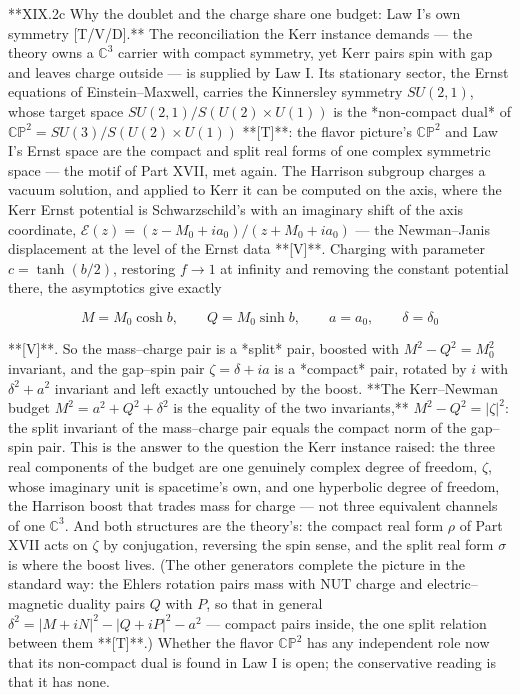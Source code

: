 **XIX.2c Why the doublet and the charge share one budget: Law I's own symmetry [T/V/D].** The reconciliation the Kerr instance demands — the theory owns a $\mathbb C^3$ carrier with compact symmetry, yet Kerr pairs spin with gap and leaves charge outside — is supplied by Law I. Its stationary sector, the Ernst equations of Einstein–Maxwell, carries the Kinnersley symmetry $SU(2,1)$, whose target space $SU(2,1)/S(U(2)\times U(1))$ is the *non-compact dual* of $\mathbb{CP}^2 = SU(3)/S(U(2)\times U(1))$ **[T]**: the flavor picture's $\mathbb{CP}^2$ and Law I's Ernst space are the compact and split real forms of one complex symmetric space — the motif of Part XVII, met again. The Harrison subgroup charges a vacuum solution, and applied to Kerr it can be computed on the axis, where the Kerr Ernst potential is Schwarzschild's with an imaginary shift of the axis coordinate, $\mathcal E(z) = (z-M_0+ia_0)/(z+M_0+ia_0)$ — the Newman–Janis displacement at the level of the Ernst data **[V]**. Charging with parameter $c = \tanh(b/2)$, restoring $f\to1$ at infinity and removing the constant potential there, the asymptotics give exactly

$$M = M_0\cosh b,\qquad Q = M_0\sinh b,\qquad a = a_0,\qquad \delta = \delta_0$$

**[V]**. So the mass–charge pair is a *split* pair, boosted with $M^2-Q^2 = M_0^2$ invariant, and the gap–spin pair $\zeta = \delta+ia$ is a *compact* pair, rotated by $i$ with $\delta^2+a^2$ invariant and left exactly untouched by the boost. **The Kerr–Newman budget $M^2 = a^2+Q^2+\delta^2$ is the equality of the two invariants,** $M^2-Q^2 = |\zeta|^2$: the split invariant of the mass–charge pair equals the compact norm of the gap–spin pair. This is the answer to the question the Kerr instance raised: the three real components of the budget are one genuinely complex degree of freedom, $\zeta$, whose imaginary unit is spacetime's own, and one hyperbolic degree of freedom, the Harrison boost that trades mass for charge — not three equivalent channels of one $\mathbb C^3$. And both structures are the theory's: the compact real form $\rho$ of Part XVII acts on $\zeta$ by conjugation, reversing the spin sense, and the split real form $\sigma$ is where the boost lives. (The other generators complete the picture in the standard way: the Ehlers rotation pairs mass with NUT charge and electric–magnetic duality pairs $Q$ with $P$, so that in general $\delta^2 = |M+iN|^2-|Q+iP|^2-a^2$ — compact pairs inside, the one split relation between them **[T]**.) Whether the flavor $\mathbb{CP}^2$ has any independent role now that its non-compact dual is found in Law I is open; the conservative reading is that it has none.

